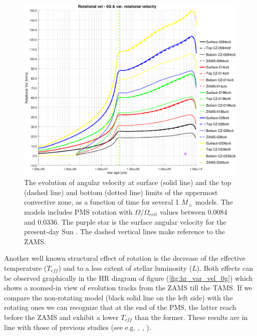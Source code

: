 \documentclass[fleqn,usenatbib]{mnras}
\begin{document}
\begin{figure}
	\includegraphics[trim = 40mm 15mm 20mm 15mm, clip,width=\columnwidth]{figures/rot_vel_var_vel_0_0g.eps}
    \caption{The evolution of angular velocity at surface (solid line) and the top (dashed line) and bottom (dotted line) limits of the uppermost convective zone, as a function of time for several 1 $M_{\sun}$ models. The models includes PMS rotation with $\Omega / \Omega_{crit}$ values between 0.0084 and 0.0336. The purple star is the surface angular velocity for the present-day Sun \citep{Gill2012}. The dashed vertical lines make reference to the ZAMS.}
    \label{fig:rot_vel_0g}
\end{figure}

Another well known structural effect of rotation is the decrease of the effective temperature ($T_{eff}$) and to a less extent of stellar luminosity ($L$). Both effects can be observed graphically in the HR diagram of figure (\ref{fig:hr_var_vel_0g}) which shows a zoomed-in view of evolution tracks from the ZAMS till the TAMS. If we compare the non-rotating model (black solid line on the left side) with the rotating ones we can recognize that at the end of the PMS, the latter reach before the ZAMS and exhibit a lower $T_{eff}$ than the former. These results are in line with those of previous studies (see e.g. \citet{Eggenberger2012}, \citet{Piau2001}, \citet{Pinsonneault1989}).\par
\end{document}
